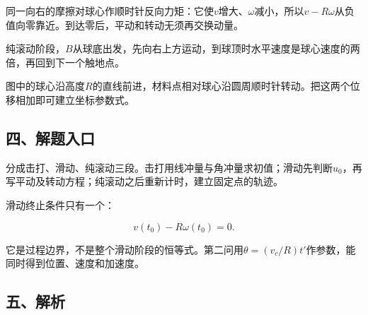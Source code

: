 \documentclass[12pt,a4paper,fontset=fandol]{ctexart}
\begin{document}
同一向右的摩擦对球心作顺时针反向力矩：它使\(v\)增大、\(\omega\)减小，所以\(v-R\omega\)从负值向零靠近。到达零后，平动和转动无须再交换动量。

纯滚动阶段，\(B\)从球底出发，先向右上方运动，到球顶时水平速度是球心速度的两倍，再回到下一个触地点。

\begin{center}
\begin{minipage}{\linewidth}
\centering\begingroup{}
\ifdim\wd\diagrambox>.88\linewidth
\sbox{\diagrambox}{\resizebox{.88\linewidth}{!}{\usebox{\diagrambox}}}\fi
\ifdim\ht\diagrambox>.38\textheight
\resizebox{!}{.38\textheight}{\usebox{\diagrambox}}
\else\usebox{\diagrambox}\fi
\par{}\endgroup\end{minipage}\end{center}

图中的球心沿高度\(R\)的直线前进，材料点相对球心沿圆周顺时针转动。把这两个位移相加即可建立坐标参数式。

\subsection{四、解题入口}\label{ux56dbux89e3ux9898ux5165ux53e3-1}

分成击打、滑动、纯滚动三段。击打用线冲量与角冲量求初值；滑动先判断\(u_0\)，再写平动及转动方程；纯滚动之后重新计时，建立固定点的轨迹。

滑动终止条件只有一个：

\[
v(t_0)-R\omega(t_0)=0.
\]

它是过程边界，不是整个滑动阶段的恒等式。第二问用\(\theta=(v_c/R)t'\)作参数，能同时得到位置、速度和加速度。

\subsection{五、解析}\label{ux4e94ux89e3ux6790-1}
\end{document}
